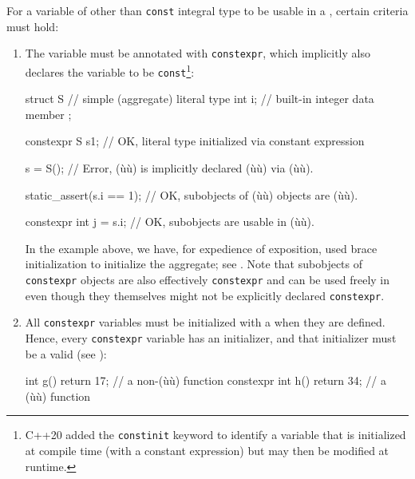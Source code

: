 For a variable of other than \lstinline!const! integral type to be usable
in a , certain criteria must hold:

\begin{enumerate}
\item{The variable must be annotated with \lstinline!constexpr!, which implicitly also declares the variable to be \lstinline!const!\footnote{C++20 added the \lstinline!constinit! keyword to identify a variable that is initialized at compile time (with a constant expression) but may then be modified at runtime.}:

\begin{emcppslisting}
struct S  // simple (aggregate) literal type
{
    int i;  // built-in integer data member
};

constexpr S s{1};  // OK, literal type initialized via constant expression

s = S();           // Error, (ù{}ù) is implicitly declared (ù{}ù) via (ù{}ù).

static_assert(s.i == 1);  // OK, subobjects of (ù{}ù) objects are (ù{}ù).

constexpr int j = s.i;    // OK, subobjects are usable in (ù{}ù).
\end{emcppslisting}
    
\noindent In the example above, we have, for expedience of exposition, used brace
initialization to initialize the aggregate; see . Note that subobjects of \lstinline!constexpr! objects
are also effectively \lstinline!constexpr! and can be used freely in
 even though they themselves might not be
explicitly declared \lstinline!constexpr!.}

\item{All \lstinline!constexpr! variables must be initialized with a  when they are defined. Hence, every \lstinline!constexpr! variable has an initializer, and that initializer must be a valid  (see ):

\begin{emcppslisting}
          int g() { return 17; }  // a non-(ù{}ù) function
constexpr int h() { return 34; }  // a (ù{}ù) function


\end{emcppslisting}}
\end{enumerate}
